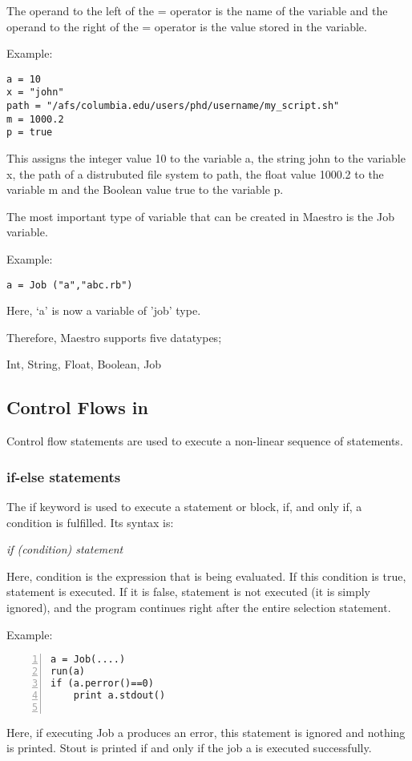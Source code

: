 The operand to the left of the = operator is the name of the variable and the operand to the right of the = operator is the value stored in the variable. 

Example:
\begin{verbatim}
a = 10
x = "john"
path = "/afs/columbia.edu/users/phd/username/my_script.sh"
m = 1000.2
p = true
\end{verbatim}

This assigns the integer value 10 to the variable a, the string john to the variable x, the path of a distrubuted file system to path, the float value 1000.2 to the variable m and the Boolean value true to the variable p.

The most important type of variable that can be created in Maestro is the Job variable.

Example:
\begin{verbatim}
a = Job ("a","abc.rb")
\end{verbatim}

Here, `a' is now a variable of 'job' type. 

Therefore, Maestro supports five datatypes;

Int, String, Float, Boolean, Job

\subsection*{Control Flows in \lang{}}
Control flow statements are used to execute a non-linear sequence of statements.
\subsubsection*{if-else statements}
The if keyword is used to execute a statement or block, if, and only if, a condition is fulfilled. Its syntax is:

\textit{if (condition) statement}

Here, condition is the expression that is being evaluated. If this condition is true, statement is executed. If it is false, statement is not executed (it is simply ignored), and the program continues right after the entire selection statement.

Example:
\begin{Verbatim}[numbers=left]
a = Job(....)
run(a)
if (a.perror()==0)
    print a.stdout()
    
\end{Verbatim}

Here, if executing Job a produces an error, this statement is ignored and nothing is printed. Stout is printed if and only if the job a is executed successfully.

